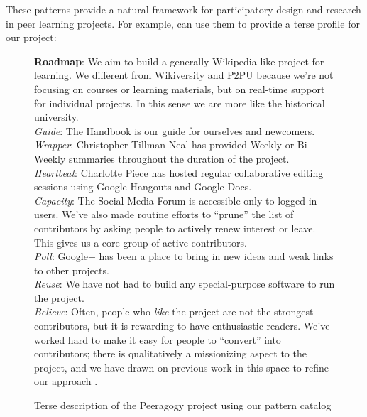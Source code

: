 \documentclass{acm_proc_article-sp}
\newenvironment{cframed}[1][blue]
  {\def\FrameCommand{\fboxsep=\FrameSep\fcolorbox{#1}{white}}%
    \MakeFramed {\advance\hsize-\width \FrameRestore}}
  {\endMakeFramed}
\begin{document}
These patterns provide a natural framework for participatory design
and research in peer learning projects.  For example, can use them to
provide a terse profile for our project:

\begin{figure}[h]
\begin{cframed}[black]
{\bf Roadmap}: We aim to build a generally Wikipedia-like project for
learning.  We different from Wikiversity and P2PU because we're not
focusing on courses or learning materials, but on real-time support
for individual projects.  In this sense we are more like the
historical university. \\

\emph{Guide}: The Handbook is our guide for ourselves and newcomers. \\

\emph{Wrapper}: Christopher Tillman Neal has provided Weekly or
Bi-Weekly summaries throughout the duration of the project. \\

\emph{Heartbeat}: Charlotte Piece has hosted regular collaborative
editing sessions using Google Hangouts and Google Docs. \\

\emph{Capacity}: The Social Media Forum is accessible only to logged in
users.  We've also made routine efforts to ``prune'' the list of
contributors by asking people to actively renew interest or leave.
This gives us a core group of active contributors. \\

\emph{Poll}: Google+ has been a place to bring in new ideas and weak
links to other projects. \\

\emph{Reuse}: We have not had to build any special-purpose software to
run the project.  \\

\emph{Believe}: Often, people who \emph{like} the project are not the
strongest contributors, but it is rewarding to have enthusiastic
readers.  We've worked hard to make it easy for people to ``convert''
into contributors; there is qualitatively a missionizing aspect to the
project, and we have drawn on previous work in this space to refine
our approach \cite{Bridges}. 
\end{cframed}
\vspace{-.2in}
\caption{Terse description of the Peeragogy project using our pattern catalog}
\end{figure}
\end{document}
